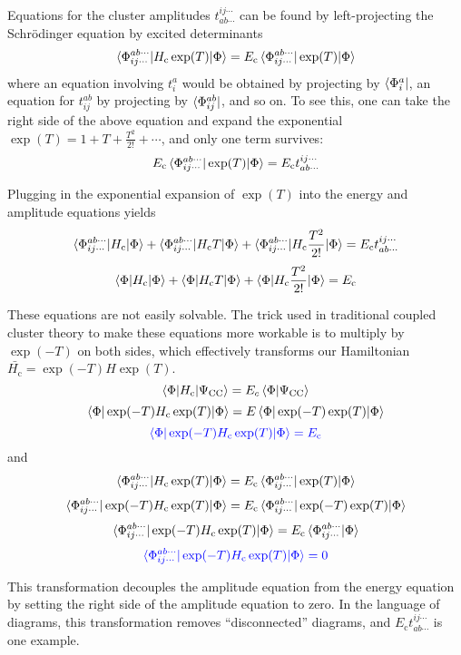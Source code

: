 \documentclass{article}
\newcommand{\Ec}{E_{\mathrm{c}}}
\newcommand{\Hc}{H_{\mathrm{c}}}
\begin{document}
Equations for the cluster amplitudes $t_{a b \cdots }^{i j \cdots}$
can be found by left-projecting the Schr{\"o}dinger equation by excited determinants
\[ \braket{ \Phi_{i j \cdots }^{a b \cdots} | \Hc \exp(T) | \Phi} = 
   \Ec \braket{\Phi_{i j \cdots }^{a b \cdots} | \exp(T) | \Phi} \]
where an equation involving $t_i^a$ would be obtained by projecting by $\bra{\Phi_{i}^{a}}$,
an equation for $t_{ij}^{ab}$ by projecting by $\bra{\Phi_{ij}^{ab}}$, and so on. 
To see this, one can take the right side of the above equation and expand the exponential $\exp(T) = 1 + T + \frac{T^2}{2!} + \cdots $, and only one term survives:
\[ \Ec \braket{\Phi_{i j \cdots }^{a b \cdots} | \exp(T) | \Phi} = \Ec t_{a b \cdots }^{i j \cdots}\]

Plugging in the exponential expansion of $\exp(T)$ into the energy and amplitude equations 
yields 
\[ \braket{\Phi_{i j \cdots }^{a b \cdots} | \Hc | \Phi} + \braket{\Phi_{i j \cdots }^{a b \cdots}| \Hc T| \Phi} + \braket{\Phi_{i j \cdots }^{a b \cdots} | \Hc \frac{T^2}{2!} | \Phi} 
   = \Ec t_{a b \cdots }^{i j \cdots}\]
\[ \braket{\Phi | \Hc | \Phi} + \braket{\Phi| \Hc T| \Phi} + \braket{\Phi | \Hc \frac{T^2}{2!} | \Phi} = \Ec \]

These equations are not easily solvable. The trick used in traditional coupled cluster 
theory to make these equations more workable is to multiply by $\exp(-T)$ on both sides,
which effectively transforms our Hamiltonian $\bar{\Hc} = \exp(-T) H \exp(T)$.
\[\braket{\Phi | \Hc | \Psi_{\mathrm{CC}}} = E_c \braket{\Phi|\Psi_{\mathrm{CC}}} \]
\[ \braket{\Phi | \exp(-T) \Hc \exp(T) | \Phi } = E \braket{\Phi | \exp(-T) \exp(T) | \Phi} \]
\[ \color{blue} \braket{\Phi | \exp(-T) \Hc \exp(T) | \Phi } = \Ec \]
and 
\\
\[ \braket{ \Phi_{i j \cdots }^{a b \cdots} | \Hc \exp(T) | \Phi} = 
    \Ec \braket{\Phi_{i j \cdots }^{a b \cdots} | \exp(T) | \Phi}  \]
\[ \braket{ \Phi_{i j \cdots }^{a b \cdots} | \exp(-T) \Hc \exp(T) | \Phi} = 
    \Ec \braket{\Phi_{i j \cdots }^{a b \cdots} | \exp(-T) \exp(T) | \Phi}  \]
\[ \braket{ \Phi_{i j \cdots }^{a b \cdots} | \exp(-T) \Hc \exp(T) | \Phi} = 
    \Ec \braket{\Phi_{i j \cdots }^{a b \cdots} | \Phi}  \]
\[ \color{blue} \braket{ \Phi_{i j \cdots }^{a b \cdots} | \exp(-T) \Hc \exp(T) | \Phi} 
   =  0  \]

This transformation decouples the amplitude equation from the energy equation
by setting the right side of the amplitude equation to zero. 
In the language of diagrams, this transformation removes ``disconnected'' diagrams,
and $\Ec t_{ab \cdots}^{ij \cdots}$ is one example. 
\end{document}
